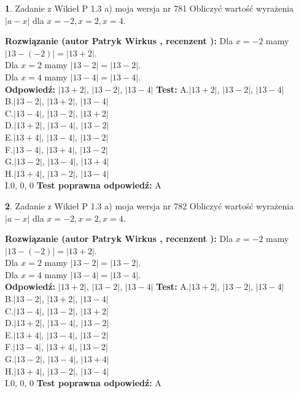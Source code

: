 \documentclass[12pt, a4paper]{article}
\theoremstyle{definition} %
\newtheorem{zad}{}
\newcommand{\zadStart}[1]{\begin{zad}#1\newline}
\newcommand{\zadStop}{\end{zad}}
\newcommand{\rozwStart}[2]{\noindent \textbf{Rozwiązanie (autor #1 , recenzent #2): }\newline}
\newcommand{\rozwStop}{\newline}
\newcommand{\odpStart}{\noindent \textbf{Odpowiedź:}\newline}
\newcommand{\odpStop}{\newline}
\newcommand{\testStart}{\noindent \textbf{Test:}\newline}
\newcommand{\testStop}{\newline}
\newcommand{\kluczStart}{\noindent \textbf{Test poprawna odpowiedź:}\newline}
\newcommand{\kluczStop}{\newline}
\begin{document}
\zadStart{Zadanie z Wikieł P 1.3 a) moja wersja nr 781}
Obliczyć wartość wyrażenia $|a - x|$ dla $x=-2,x=2,x=4$.
\zadStop
\rozwStart{Patryk Wirkus}{}
Dla $x = -2$ mamy $|13 - (-2)| = |13 + 2|$.\\
Dla $x = 2$ mamy $|13 - 2| = |13 - 2|$.\\
Dla $x = 4$ mamy $|13 - 4| = |13 - 4|$.\\
\rozwStop
\odpStart
$|13 + 2|$, $|13 - 2|$, $|13 - 4|$
\odpStop
\testStart
A.$|13 + 2|$, $|13 - 2|$, $|13 - 4|$\\
B.$|13 - 2|$, $|13 + 2|$, $|13 - 4|$\\
C.$|13 - 4|$, $|13 - 2|$, $|13 + 2|$\\
D.$|13 + 2|$, $|13 - 4|$, $|13 - 2|$\\
E.$|13 + 4|$, $|13 - 4|$, $|13 - 2|$\\
F.$|13 - 4|$, $|13 + 4|$, $|13 - 2|$\\
G.$|13 - 2|$, $|13 - 4|$, $|13 + 4|$\\
H.$|13 + 4|$, $|13 - 2|$, $|13 - 4|$\\
I.$0$, $0$, $0$
\testStop
\kluczStart
A
\kluczStop



\zadStart{Zadanie z Wikieł P 1.3 a) moja wersja nr 782}
Obliczyć wartość wyrażenia $|a - x|$ dla $x=-2,x=2,x=4$.
\zadStop
\rozwStart{Patryk Wirkus}{}
Dla $x = -2$ mamy $|13 - (-2)| = |13 + 2|$.\\
Dla $x = 2$ mamy $|13 - 2| = |13 - 2|$.\\
Dla $x = 4$ mamy $|13 - 4| = |13 - 4|$.\\
\rozwStop
\odpStart
$|13 + 2|$, $|13 - 2|$, $|13 - 4|$
\odpStop
\testStart
A.$|13 + 2|$, $|13 - 2|$, $|13 - 4|$\\
B.$|13 - 2|$, $|13 + 2|$, $|13 - 4|$\\
C.$|13 - 4|$, $|13 - 2|$, $|13 + 2|$\\
D.$|13 + 2|$, $|13 - 4|$, $|13 - 2|$\\
E.$|13 + 4|$, $|13 - 4|$, $|13 - 2|$\\
F.$|13 - 4|$, $|13 + 4|$, $|13 - 2|$\\
G.$|13 - 2|$, $|13 - 4|$, $|13 + 4|$\\
H.$|13 + 4|$, $|13 - 2|$, $|13 - 4|$\\
I.$0$, $0$, $0$
\testStop
\kluczStart
A
\kluczStop
\end{document}
